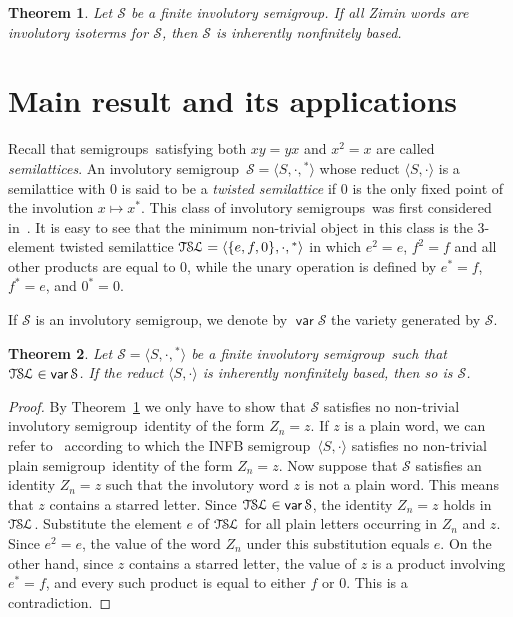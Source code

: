\documentclass[smallextended]{svjour3}
\newcommand{\sgp}{semi\-group}
\newcommand{\sgps}{semi\-groups}
\newcommand{\is}{involutory semi\-group}
\newcommand{\iss}{involutory semi\-groups}
\newcommand{\fis}{finite involutory semi\-group}
\newcommand{\infb}{inherently non\-finitely based}
\newcommand{\TSL}{\ensuremath{\mathcal{T\kern-.5pt S\kern-.5pt L}}}
\newtheorem{Thm}{Theorem}[section]
\DeclareMathOperator{\var}{\mathsf{var}}
\begin{document}
\begin{Thm}
\label{Theorem 2.2} Let $\mathcal{S}$ be a \fis. If all Zimin words are involutory isoterms for $\mathcal{S}$, then $\mathcal{S}$ is \infb.
\end{Thm}

\section{Main result and its applications}
\label{sec:main}

Recall that \sgps\ satisfying both $xy=yx$ and $x^2=x$ are called \emph{semilattices}. An \is\ $\mathcal{S}=\langle S,\cdot,{}^*\rangle$
whose reduct $\langle S,\cdot\rangle$ is a semilattice with 0 is said to be a \emph{twisted semilattice} if 0 is the only fixed point of
the involution $x\mapsto x^*$. This class of \iss\ was first considered in~\cite{Fajt}. It is easy to see that the minimum non-trivial
object in this class is the 3-element twisted semilattice $\TSL=\langle\{e,f,0\},\cdot,{}^*\rangle$ in which $e^2=e$, $f^2=f$ and all other
products are equal to $0$, while the unary operation is defined by $e^*=f$, $f^*=e$, and $0^*=0$.

If $ \mathcal{S}$ is an \is, we denote by $\var\mathcal{S}$ the variety generated by $\mathcal{S}$.

\begin{Thm}
\label{twisted} Let $\mathcal{S}=\langle S,\cdot,{}^*\rangle$ be a \fis\ such that $\TSL\in\var\mathcal{S}$. If the reduct $\langle
S,\cdot\rangle$ is \infb, then so is $\mathcal{S}$.
\end{Thm}

\begin{proof}
By Theorem~\ref{Theorem 2.2} we only have to show that $\mathcal{S}$ satisfies no non-trivial \is\ identity of the form $Z_n=z$. If $z$ is
a plain word, we can refer to~\cite[Proposition~7]{sapirburnside} according to which the INFB \sgp\ $\langle S,\cdot\rangle$ satisfies no
non-trivial plain \sgp\ identity of the form $Z_n=z$. Now suppose that $\mathcal{S}$ satisfies an identity $Z_n=z$ such that the involutory
word $z$ is not a plain word. This means that $z$ contains a starred letter. Since $\TSL\in\var\mathcal{S}$, the identity $Z_n=z$ holds in
$\TSL$. Substitute the element $e$ of $\TSL$ for all plain letters occurring in $Z_n$ and $z$. Since $e^2=e$, the value of the word $Z_n$
under this substitution equals $e$. On the other hand, since $z$ contains a starred letter, the value of $z$ is a product involving
$e^*=f$, and every such product is equal to either $f$ or 0. This is a contradiction.
\end{proof}
\end{document}

